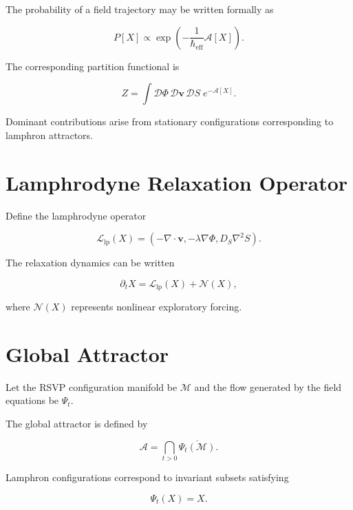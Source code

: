 \documentclass[12pt]{article}
\begin{document}
The probability of a field trajectory may be written formally as

\begin{equation}
P[X]
\propto
\exp\!\left(
-\frac{1}{\hbar_{\mathrm{eff}}}
\mathcal{A}[X]
\right).
\end{equation}

The corresponding partition functional is

\begin{equation}
Z =
\int
\mathcal{D}\Phi\,
\mathcal{D}\mathbf{v}\,
\mathcal{D}S\;
e^{-\mathcal{A}[X]} .
\end{equation}

Dominant contributions arise from stationary configurations corresponding to lamphron attractors.

\section{Lamphrodyne Relaxation Operator}

Define the lamphrodyne operator

\begin{equation}
\mathcal{L}_{\mathrm{lp}}(X)
=
\left(
-\nabla \cdot \mathbf{v},
-\lambda \nabla \Phi,
D_S \nabla^2 S
\right).
\end{equation}

The relaxation dynamics can be written

\begin{equation}
\partial_t X
=
\mathcal{L}_{\mathrm{lp}}(X)
+
\mathcal{N}(X),
\end{equation}

where $\mathcal{N}(X)$ represents nonlinear exploratory forcing.

\section{Global Attractor}

Let the RSVP configuration manifold be $\mathcal{M}$ and the flow generated by the field equations be $\Psi_t$.

The global attractor is defined by

\begin{equation}
\mathcal{A}
=
\bigcap_{t>0}
\overline{\Psi_t(\mathcal{M})}.
\end{equation}

Lamphron configurations correspond to invariant subsets satisfying

\begin{equation}
\Psi_t(X) = X .
\end{equation}
\end{document}
